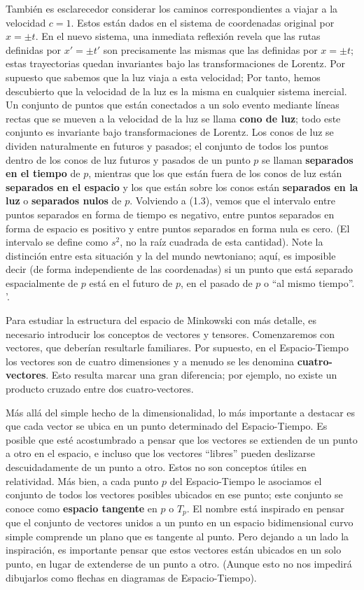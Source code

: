 \documentclass[11pt,b5paper,openany,twoside]{book}
\begin{document}
También es esclarecedor considerar los caminos correspondientes a viajar a la velocidad $c=1$.
Estos están dados en el sistema de coordenadas original por $x=\pm t$.
En el nuevo sistema, una inmediata reflexión revela que las rutas definidas por $x' = \pm t'$ son precisamente las mismas que las definidas por $x=\pm t$; estas trayectorias quedan invariantes bajo las transformaciones de Lorentz.
Por supuesto que sabemos que la luz viaja a esta velocidad; Por tanto, hemos descubierto que la velocidad de la luz es la misma en cualquier sistema inercial.
Un conjunto de puntos que están conectados a un solo evento mediante líneas rectas que se mueven a la velocidad de la luz se llama {\bf cono de luz}; todo este conjunto es invariante bajo transformaciones de Lorentz.
Los conos de luz se dividen naturalmente en futuros y pasados; el conjunto de todos los puntos dentro de los conos de luz futuros y pasados de un punto $p$ se llaman {\bf separados en el tiempo} de $p$, mientras que los que están fuera de los conos de luz están {\bf separados en el espacio} y los que están sobre los conos están {\bf separados en la luz} o {\bf separados nulos} de $p$.
Volviendo a (1.3), vemos que el intervalo entre puntos separados en forma de tiempo es negativo, entre puntos separados en forma de espacio es positivo y entre puntos separados en forma nula es cero.
(El intervalo se define como $s^2$, no la raíz cuadrada de esta cantidad).
Note la distinción entre esta situación y la del mundo newtoniano; aquí, es imposible decir (de forma independiente de las coordenadas) si un punto que está separado espacialmente de $p$ está en el futuro de $p$, en el pasado de $p$ o ``al mismo tiempo''. '.

Para estudiar la estructura del espacio de Minkowski con más detalle, es necesario introducir los conceptos de vectores y tensores.
Comenzaremos con vectores, que deberían resultarle familiares.
Por supuesto, en el Espacio-Tiempo los vectores son de cuatro dimensiones y a menudo se les denomina {\bf cuatro-vectores}.
Esto resulta marcar una gran diferencia; por ejemplo, no existe un producto cruzado entre dos cuatro-vectores.

Más allá del simple hecho de la dimensionalidad, lo más importante a destacar es que cada vector se ubica en un punto determinado del Espacio-Tiempo.
Es posible que esté acostumbrado a pensar que los vectores se extienden de un punto a otro en el espacio, e incluso que los vectores ``libres'' pueden deslizarse descuidadamente de un punto a otro.
Estos no son conceptos útiles en relatividad.
Más bien, a cada punto $p$ del Espacio-Tiempo le asociamos el conjunto de todos los vectores posibles ubicados en ese punto; este conjunto se conoce como {\bf espacio tangente} en $p$ o $T_p$.
El nombre está inspirado en pensar que el conjunto de vectores unidos a un punto en un espacio bidimensional curvo simple comprende un plano que es tangente al punto.
Pero dejando a un lado la inspiración, es importante pensar que estos vectores están ubicados en un solo punto, en lugar de extenderse de un punto a otro.
(Aunque esto no nos impedirá dibujarlos como flechas en diagramas de Espacio-Tiempo).
\end{document}
